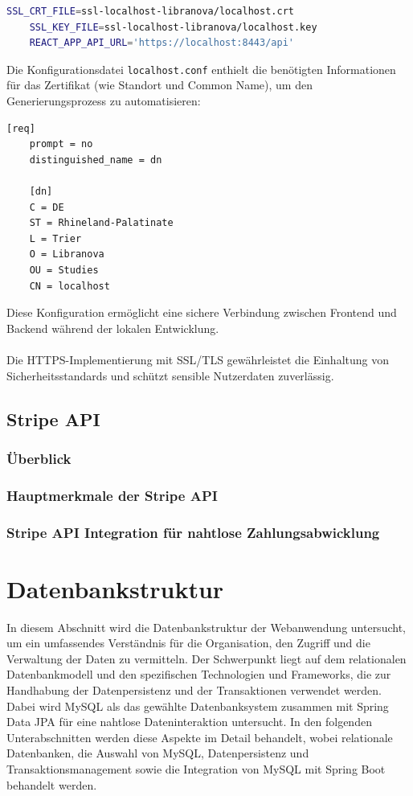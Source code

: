 \begin{lstlisting}[language=bash, caption={.env Konfiguration für HTTPS und API-Zugriff}]
	SSL_CRT_FILE=ssl-localhost-libranova/localhost.crt
	SSL_KEY_FILE=ssl-localhost-libranova/localhost.key
	REACT_APP_API_URL='https://localhost:8443/api'
\end{lstlisting}
Die Konfigurationsdatei \texttt{localhost.conf} enthielt die benötigten Informationen für das Zertifikat (wie Standort und Common Name), um den Generierungsprozess zu automatisieren:

\begin{lstlisting}[caption={localhost.conf}]
	[req]
	prompt = no
	distinguished_name = dn
	
	[dn]
	C = DE
	ST = Rhineland-Palatinate
	L = Trier
	O = Libranova
	OU = Studies
	CN = localhost
\end{lstlisting}
Diese Konfiguration ermöglicht eine sichere Verbindung zwischen Frontend und Backend während der lokalen Entwicklung. \\ \\
Die HTTPS-Implementierung mit SSL/TLS gewährleistet die Einhaltung von Sicherheitsstandards und schützt sensible Nutzerdaten zuverlässig.



\subsection{Stripe API}

\subsubsection{Überblick}

\subsubsection{Hauptmerkmale der Stripe API}

\subsubsection{Stripe API Integration für nahtlose Zahlungsabwicklung}

\section{Datenbankstruktur}
In diesem Abschnitt wird die Datenbankstruktur der Webanwendung untersucht, um ein umfassendes Verständnis für die Organisation, den Zugriff und die Verwaltung der Daten zu vermitteln. Der Schwerpunkt liegt auf dem relationalen Datenbankmodell und den spezifischen Technologien und Frameworks, die zur Handhabung der Datenpersistenz und der Transaktionen verwendet werden. Dabei wird MySQL als das gewählte Datenbanksystem zusammen mit Spring Data JPA für eine nahtlose Dateninteraktion untersucht. In den folgenden Unterabschnitten werden diese Aspekte im Detail behandelt, wobei relationale Datenbanken, die Auswahl von MySQL, Datenpersistenz und Transaktionsmanagement sowie die Integration von MySQL mit Spring Boot behandelt werden.
